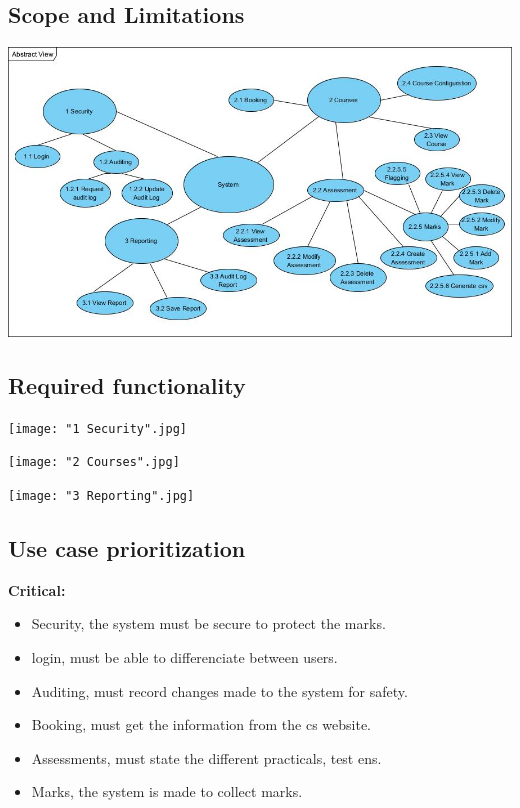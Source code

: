 \documentclass[10pt,a4paper]{article}
\begin{document}
\subsection{Scope and Limitations}

\begin{center}
\includegraphics[scale=0.5]{AbstractView.jpg}
\end{center}


\subsection{Required functionality}


\texttt{[image: "1 Security".jpg]}

\texttt{[image: "2 Courses".jpg]}

\texttt{[image: "3 Reporting".jpg]}

\subsection{Use case prioritization}

\textbf{Critical:}
 \begin{itemize}
	\item Security, the system must be secure to protect the marks.
 \end{itemize}

 \begin{itemize}
	\item login, must be able to differenciate between users. 
 \end{itemize}
 \begin{itemize}
	\item Auditing, must record changes made to the system for safety. 
 \end{itemize}
 \begin{itemize}
	\item Booking, must get the information from the cs website.
 \end{itemize}
 \begin{itemize}
	\item Assessments, must state the different practicals, test ens.
 \end{itemize}
 \begin{itemize}
	\item Marks, the system is made to collect marks.
 \end{itemize}
 
\end{document}
